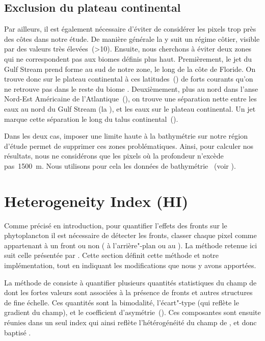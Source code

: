\subsection{Exclusion du plateau continental}

Par ailleurs, il est également nécessaire d'éviter de considérer les pixels trop près des côtes dans notre étude.
De manière générale la  y suit un régime côtier, visible par des valeurs très élevées~(\qty{>10}{\mgm}).
Ensuite, nous cherchons à éviter deux zones qui ne correspondent pas aux biomes définis plus haut.
Premièrement, le jet du Gulf Stream prend forme au sud de notre zone, le long de la côte de Floride. On trouve donc sur le plateau continental à ces latitudes~() de forts courants qu'on ne retrouve pas dans le reste du biome .
Deuxièmement, plus au nord dans l'anse Nord-Est Américaine de l'Atlantique~(), on trouve une séparation nette entre les eaux au nord du Gulf Stream (la ), et les eaux sur le plateau continental.
Un jet marque cette séparation le long du talus continental~(\cite{flagg_2006}).

Dans les deux cas, imposer une limite haute à la bathymétrie sur notre région d'étude permet de supprimer ces zones problématiques.
Ainsi, pour calculer nos résultats, nous ne considérons que les pixels où la profondeur n'excède pas~\qty{1500}{\m}.
Nous utilisons pour cela les données de bathymétrie ~(voir ).

\section{Heterogeneity Index (HI)}
\label{sec:HI}

Comme précisé en introduction, pour quantifier l'effets des fronts sur le phytoplancton il est nécessaire de détecter les fronts,  classer chaque pixel comme appartenant à un front ou non ( à l'arrière"-plan ou au ).
La méthode retenue ici suit celle présentée par \textcite{liu_2016} .
Cette section définit cette méthode et notre implémentation, tout en indiquant les modifications que nous y avons apportées.

La méthode de \textcite{liu_2016} consiste à quantifier plusieurs quantités statistiques du champ de  dont les fortes valeurs sont associées à la présence de fronts et autres structures de fine échelle.
Ces quantités sont la bimodalité, l'écart"-type (qui reflète le gradient du champ), et le coefficient d'asymétrie~().
Ces composantes sont ensuite réunies dans un seul index qui ainsi reflète l'hétérogénéité du champ de , et donc baptisé .

